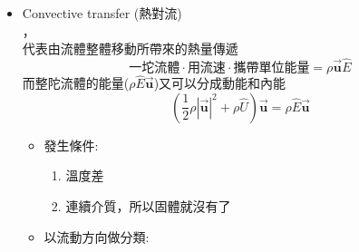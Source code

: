 \documentclass[../main.tex]{subfiles}
\begin{document}
\begin{itemize}
\begin{itemize}
\begin{equation}
        \end{equation}
        所以如果是氣體的時候Fourier's law通常只能算穩態(溫度、壓力不變)下的熱傳\\
        另外在固體中，金屬$>$非金屬，因為金屬有，所以熱傳導效率會比較好\\
        排序是: 銀$>$銅$>$金$>$鋁\\
        不過在固體中，非金屬的$k\propto T$\\
        而金屬則，主要跟自由電子受溫度影響有關
        \begin{align}
          k\propto T & \quad \text{鋁、金、鉑、不鏽鋼} \nonumber\\
          k\propto \frac{1}{T} & \quad \text{銅、銀、鐵、鉛、鎳、鋅、錫} \nonumber
        \end{align}
      \item Convective transfer (熱對流)\\
        ，\\
        代表由流體整體移動所帶來的熱量傳遞
        \begin{equation}
          \text{一坨流體}\cdot\text{用流速}\cdot \text{攜帶單位能量} = \rho \vec{\bm u} \hat E
        \end{equation}
        而整陀流體的能量($\rho \hat E \vec{\bm u}$)又可以分成動能和內能
        \begin{equation}
          \left(\frac{1}{2}\rho \left|\vec{\bm u}\right|^2 + \rho \hat U\right)\vec{\bm u} = \rho \hat E \vec{\bm u} \label{eq:convective_energy_flux}
        \end{equation}
        \begin{itemize}
        \item 發生條件:
          \begin{enumerate}
            \item 溫度差
            \item {}連續介質，所以固體就沒有了
          \end{enumerate}
        \item 以流動方向做分類:
        \begin{figure}[H]
          \centering
\end{figure}
\end{itemize}
\end{itemize}
\end{itemize}
\end{document}
